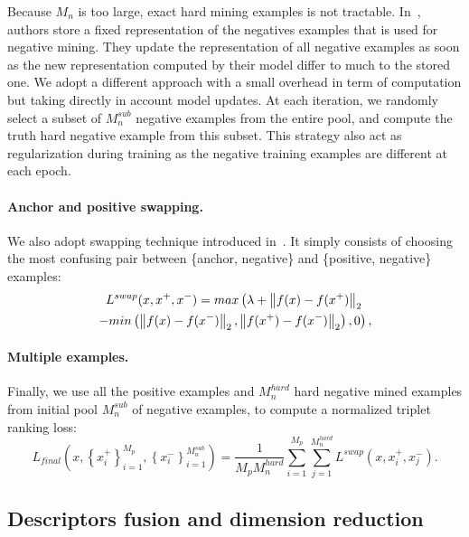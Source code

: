 Because $M_n$ is too large, exact hard mining examples is not tractable. In~\citep{Arandjelovic2017}, authors store a fixed representation of the negatives examples that is used for negative mining. They update the representation of all negative examples as soon as the new representation computed by their model differ to much to the stored one. We adopt a different approach with a small overhead in term of computation but taking directly in account model updates. At each iteration, we randomly select a subset of $M_n^{sub}$ negative examples from the entire pool, and compute the truth hard negative example from this subset. This strategy also act as regularization during training as the negative training examples are different at each epoch.

\paragraph{Anchor and positive swapping.} We also adopt swapping technique introduced in~\citep{Balntas2016}. It simply consists of choosing the most confusing pair between \{anchor, negative\} and \{positive, negative\} examples:
\begin{multline}
\label{eq:triplet_loss_w_swap}
L^{swap}(x, x^+, x^-) = max\left(\lambda + \left\lVert f(x) - f(x^+)\right\rVert_2 \right. \\
\left. - min\left(\left\lVert f(x) - f(x^-)\right\rVert_2, \left\lVert f(x^+) - f(x^-)\right\rVert_2 \right), 0 \right),
\end{multline}

\paragraph{Multiple examples.} Finally, we use all the positive examples and $M_n^{hard}$ hard negative mined examples from initial pool $M_n^{sub}$ of negative examples, to compute a normalized triplet ranking loss:
\begin{equation}
	L_{final}\left( x, \left\lbrace x^+_i\right\rbrace_{i=1}^{M_p}, \left\lbrace x^-_i\right\rbrace_{i=1}^{M_n^{sub}} \right) = \frac{1}{M_p M_n^{hard}} \sum_{i=1}^{M_p} \sum_{j=1}^{M_n^{hard}} L^{swap}\left( x, x^+_i, x^-_j \right).
\end{equation}

\subsection{Descriptors fusion and dimension reduction}

\label{subsec:fuse_desc}
